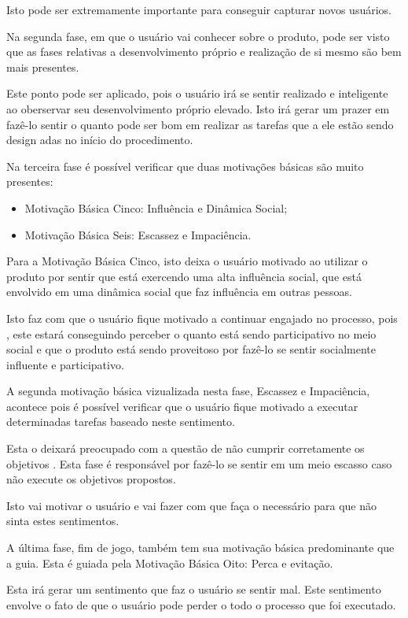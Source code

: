 Isto pode ser extremamente importante para conseguir capturar novos usuários.

Na segunda fase, em que o usuário vai conhecer sobre o produto, pode ser visto
que as fases relativas a desenvolvimento próprio e realização de si mesmo
são bem mais presentes.

Este ponto pode ser aplicado, pois o usuário irá se sentir realizado e inteligente
ao oberservar seu desenvolvimento próprio elevado. Isto irá gerar um prazer em fazê-lo
sentir o quanto pode ser bom em realizar as tarefas que a ele estão sendo design
adas
no início do procedimento.

Na terceira fase é possível verificar que duas motivações básicas são muito presentes:

\begin{itemize}
    \item Motivação Básica Cinco: Influência e Dinâmica Social;
    \item Motivação Básica Seis: Escassez e Impaciência.
\end{itemize}


Para a Motivação Básica Cinco, isto deixa o usuário motivado ao utilizar o produto
por sentir que está exercendo uma alta influência social, que está envolvido em
uma dinâmica social que faz influência em outras pessoas.

Isto faz com que o usuário fique motivado a continuar engajado no processo, pois
,
este estará conseguindo perceber o quanto está sendo participativo no meio social
e que o produto está sendo proveitoso por fazê-lo se sentir socialmente influente
e participativo.


A segunda motivação básica vizualizada nesta fase, Escassez e Impaciência, acontece
pois é possível verificar que o usuário fique motivado a executar determinadas
tarefas baseado neste sentimento.

Esta o deixará preocupado com a questão de não cumprir corretamente os objetivos
.
Esta fase é responsável por fazê-lo se sentir em um meio escasso caso não execute
os objetivos propostos.

Isto vai motivar o usuário e vai fazer com que faça o necessário para que não
sinta estes sentimentos.

A última fase, fim de jogo, também tem sua motivação básica predominante que
a guia. Esta é guiada pela Motivação Básica Oito: Perca e evitação.

Esta irá gerar um sentimento que faz o usuário se sentir mal. Este sentimento
envolve o fato de que o usuário pode perder o todo o processo que foi executado.



